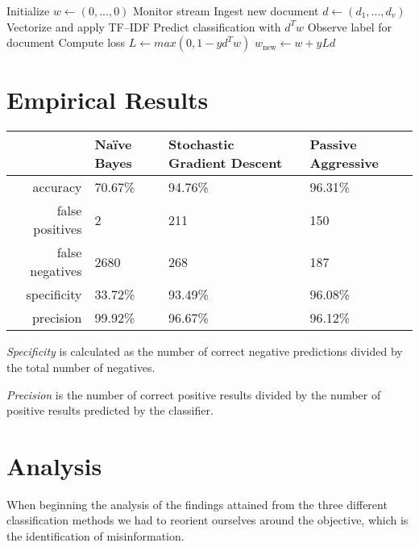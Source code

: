 \documentclass[12pt]{article}
\begin{document}
	\def\BState{\State\hskip-\ALG@thistlm}
	\makeatother
	\begin{algorithm}
	\begin{algorithmic}[1]
			\State Initialize $w \gets (0, ..., 0)$
			\State Monitor stream
			\State Ingest new document $d \gets (d_1, ..., d_v)$
			\State Vectorize and apply TF--IDF
			\State Predict classification with $d^T w$
			\State Observe label for document
			\State Compute loss $L \gets max(0, 1 - y d^T w)$
			\State $w_{\text{new}} \gets w + y L d$
			\EndProcedure
		\end{algorithmic}
	\end{algorithm}


	\section{Empirical Results}

	\begin{tabular}{r | l l l}
		                & Naïve Bayes & Stochastic Gradient Descent & Passive Aggressive \\
		\hline
		accuracy        & 70.67\%     & 94.76\%                     & 96.31\%            \\
		false positives & 2           & 211                         & 150                \\
		false negatives & 2680        & 268                         & 187                \\
		specificity     & 33.72\%     & 93.49\%                     & 96.08\%            \\
		precision       & 99.92\%     & 96.67\%                     & 96.12\%            \\
	\end{tabular}
    \break
    
	\textit{Specificity} is calculated as the number of correct negative predictions divided by the total number of negatives.

	\textit{Precision} is the number of correct positive results divided by the number of positive results predicted by the classifier.

	\section{Analysis}

    When beginning the analysis of the findings attained from the three different classification methods we had to reorient ourselves around the objective, which is the identification of misinformation.
    
\end{document}
